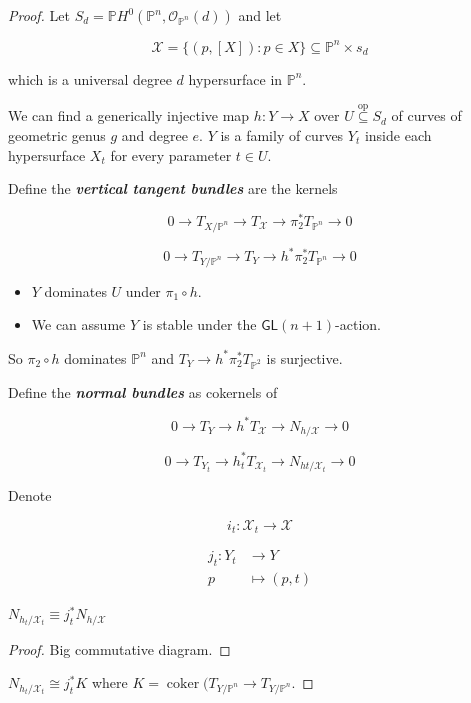 \begin{proof}
Let
$S_d=\mathbb{P}H^{0}(\mathbb{P}^n,
\mathcal{O}_{\mathbb{P}^n}(d))$
and let

$$
\mathcal{X}=\{(p,[X]):p\in X\}\subseteq
\mathbb{P}^n\times s_d
$$

which is a universal degree $d$ hypersurface
in $\mathbb{P}^n$.

We can find a generically injective map
$h:Y\to X$ over $U
\overset{\operatorname{op}}{\subseteq} S_d$
of curves of geometric genus $g$ and degree
$e$. {$Y$ is a family of curves $Y_t$ inside
each hypersurface $X_t$ for every parameter
$t\in U$}.

Define the \textit{\textbf{vertical tangent
bundles}} are the kernels

$$
0\to T_{X/\mathbb{P}^n}\to T_{\mathcal{X}}\to
\pi^* _2T_{\mathbb{P}^n}\to 0
$$

$$
0\to T_{Y/\mathbb{P}^n}\to T_Y\to  h^*\pi^*
_2T_{\mathbb{P}^n}\to 0
$$

\begin{itemize}
\item $Y$ dominates $U$ under $\pi_1\circ h$.
\item We can assume $Y$ is stable under the
$\mathsf{GL}(n+1)$-action.
\end{itemize}
So $\pi_2\circ h$ dominates $\mathbb{P}^n$
and $T_Y \longrightarrow h^*\pi^*
_2T_{\mathbb{P}^2} $ is surjective.

Define the \textit{\textbf{normal bundles}}
as cokernels of

$$
0\to T_Y\to h ^* T_{\mathcal{X}}\to
N_{h/\mathcal{X}}\to 0
$$

$$
0\to T_{Y_t}\to h_t^* T_{\mathcal{X}_t}\to
N_{ht/\mathcal{X}_t}\to 0
$$

Denote

$$
i_t:\mathcal{X}_t\to\mathcal{X}
$$

$$
\begin{aligned}
j_t:Y_t &\longrightarrow Y \\
p &\longmapsto (p,t)
\end{aligned}
$$

\medskip{}
$N_{h_t/\mathcal{X}_t}\equiv j^* _t
N_{h/\mathcal{X}}$

\begin{proof}
Big commutative diagram.
\end{proof}

\medskip{}
$N_{h_t/\mathcal{X}_t}\cong j^*_t K$ where
$K=\operatorname{coker}(T_{Y/\mathbb{P}^n}\to
T_{Y/\mathbb{P}^n}$.


\end{proof}
